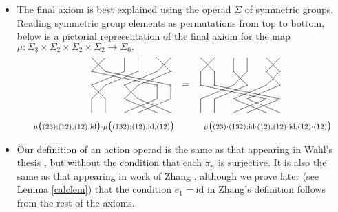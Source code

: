 \documentclass{amsbook} %
\numberwithin{section}{chapter}
\begin{document}
\begin{rem}
\begin{itemize}
\item The final axiom is best explained using the operad $\Sigma$ of symmetric groups.  Reading symmetric group elements as permutations from top to bottom, below is a pictorial representation of the final axiom for the map $\mu:\Sigma_{3} \times \Sigma_{2} \times \Sigma_{2} \times \Sigma_{2} \rightarrow \Sigma_{6}.$
\[
\xy
{\ar@{-} (0,0)*{}; (5,-5)*{} };
{\ar@{-} (5,-5)*{}; (29,-10)*{} };
{\ar@{-} (5,0)*{}; (0,-5)*{} };
{\ar@{-} (0,-5)*{}; (24,-10)*{} };
{\ar@{-} (12,0)*{}; (12,-5)*{} };
{\ar@{-} (12,-5)*{}; (0,-10)*{} };
{\ar@{-} (17,0)*{}; (17,-5)*{} };
{\ar@{-} (17,-5)*{}; (5,-10)*{} };
{\ar@{-} (24,0)*{}; (29,-5)*{} };
{\ar@{-} (29,-5)*{}; (17,-10)*{} };
{\ar@{-} (29,0)*{}; (24,-5)*{} };
{\ar@{-} (24,-5)*{}; (12,-10)*{} };
{\ar@{-} (0,-10)*{}; (5,-15)*{} };
{\ar@{-} (5,-10)*{}; (0,-15)*{} };
{\ar@{-} (12,-10)*{}; (17,-15)*{} };
{\ar@{-} (17,-10)*{}; (12,-15)*{} };
{\ar@{-} (24,-10)*{}; (24,-15)*{} };
{\ar@{-} (29,-10)*{}; (29,-15)*{} };
{\ar@{-} (0,-15)*{}; (0,-20)*{} };
{\ar@{-} (5,-15)*{}; (5,-20)*{} };
{\ar@{-} (12,-15)*{}; (24,-20)*{} };
{\ar@{-} (17,-15)*{}; (29,-20)*{} };
{\ar@{-} (24,-15)*{}; (12,-20)*{} };
{\ar@{-} (29,-15)*{}; (17,-20)*{} };
{\ar@{-} (40,0)*{}; (45,-5)*{} };
{\ar@{-} (45,0)*{}; (40,-5)*{} };
{\ar@{-} (52,0)*{}; (52,-5)*{} };
{\ar@{-} (57,0)*{}; (57,-5)*{} };
{\ar@{-} (64,0)*{}; (69,-5)*{} };
{\ar@{-} (69,0)*{}; (64,-5)*{} };
{\ar@{-} (40,-5)*{}; (40,-10)*{} };
{\ar@{-} (45,-5)*{}; (45,-10)*{} };
{\ar@{-} (52,-5)*{}; (57,-10)*{} };
{\ar@{-} (57,-5)*{}; (52,-10)*{} };
{\ar@{-} (64,-5)*{}; (69,-10)*{} };
{\ar@{-} (69,-5)*{}; (64,-10)*{} };
{\ar@{-} (40,-10)*{}; (64,-15)*{} };
{\ar@{-} (45,-10)*{}; (69,-15)*{} };
{\ar@{-} (52,-10)*{}; (40,-15)*{} };
{\ar@{-} (57,-10)*{}; (45,-15)*{} };
{\ar@{-} (64,-10)*{}; (52,-15)*{} };
{\ar@{-} (69,-10)*{}; (57,-15)*{} };
{\ar@{-} (40,-15)*{}; (40,-20)*{} };
{\ar@{-} (45,-15)*{}; (45,-20)*{} };
{\ar@{-} (52,-15)*{}; (64,-20)*{} };
{\ar@{-} (57,-15)*{}; (69,-20)*{} };
{\ar@{-} (64,-15)*{}; (52,-20)*{} };
{\ar@{-} (69,-15)*{}; (57,-20)*{} };
(34.5,-10)*+{=};
(4.5,-25)*{\scriptstyle \mu\big((23);(12),(12), \textrm{id}\big) \cdot \mu\big((132); (12), \textrm{id}, (12)\big) };
(64.5,-25)*{\scriptstyle \mu\big((23)\cdot (132); \textrm{id} \cdot (12), (12) \cdot \textrm{id}, (12) \cdot (12)\big)} ;
\endxy
\]
\item Our definition of an action operad is the same as that appearing in Wahl's thesis \cite{wahl-thesis}, but without the condition that each $\pi_{n}$ is surjective.  It is also the same as that appearing in work of Zhang \cite{zhang-grp}, although we prove later (see Lemma \ref{calclem}) that the condition $e_{1} = \textrm{id}$ in Zhang's definition follows from the rest of the axioms.
\end{itemize}
\end{rem}
\end{document}
